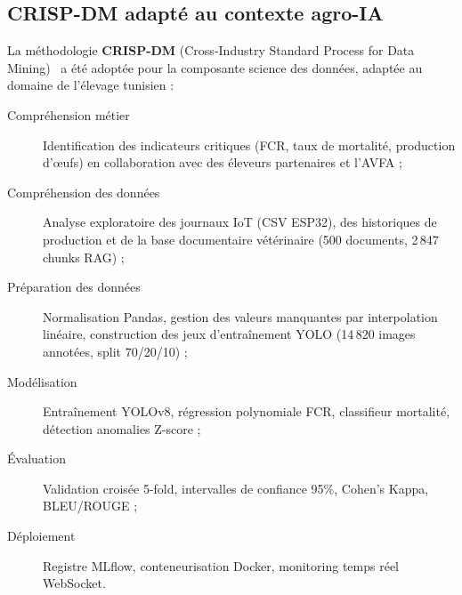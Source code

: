 \subsection{CRISP-DM adapté au contexte agro-IA}

La méthodologie \textbf{CRISP-DM} (Cross-Industry Standard Process for
Data Mining)~\cite{wirth2000} a été adoptée pour la composante science des
données, adaptée au domaine de l'élevage tunisien :

\begin{description}
  \item[Compréhension métier] Identification des indicateurs critiques
  (FCR, taux de mortalité, production d'œufs) en collaboration avec des
  éleveurs partenaires et l'AVFA ;
  \item[Compréhension des données] Analyse exploratoire des journaux IoT
  (CSV ESP32), des historiques de production et de la base documentaire
  vétérinaire (500 documents, 2\,847 chunks RAG) ;
  \item[Préparation des données] Normalisation Pandas, gestion des
  valeurs manquantes par interpolation linéaire, construction des jeux
  d'entraînement YOLO (14\,820 images annotées, split 70/20/10) ;
  \item[Modélisation] Entraînement YOLOv8, régression polynomiale FCR,
  classifieur mortalité, détection anomalies Z-score ;
  \item[Évaluation] Validation croisée 5-fold, intervalles de confiance
  95\%, Cohen's Kappa, BLEU/ROUGE ;
  \item[Déploiement] Registre MLflow, conteneurisation Docker, monitoring
  temps réel WebSocket.
\end{description}

